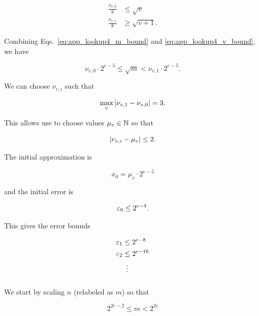 \begin{align}
    \frac{\nu_{v,0}}{8} &\le \sqrt{v} \nonumber\\
    \frac{\nu_{v,1}}{8} &\ge \sqrt{v+1}.
    \label{eq:app_lookup4_v_bound}
\end{align}

\noindent
Combining Eqs.~\eqref{eq:app_lookup4_m_bound} and
\eqref{eq:app_lookup4_v_bound},
we have

\begin{equation}
    \nu_{v,0}\cdot2^{e-5} \le \sqrt{m} < \nu_{v,1}\cdot2^{e-5}.
\end{equation}

\noindent
We can choose $\nu_{v,i}$ such that

\begin{equation}
    \max_{v} \left| \nu_{v,1} - \nu_{v,0} \right| = 3.
\end{equation}

\noindent
This allows use to choose values $\mu_{v}\in\mathbb{N}$ so that

\begin{equation}
    \left| \nu_{v,i} - \mu_{v} \right| \le 2.
\end{equation}

The initial approximation is

\begin{equation}
    x_{0} = \mu_{v}\cdot2^{e-5}
\end{equation}

\noindent
and the initial error is

\begin{equation}
    \varepsilon_{0} \le 2^{e-4}.
\end{equation}

\noindent
This gives the error bounds

\begin{align}
    \varepsilon_{1} &\le 2^{e-8} \nonumber\\
    \varepsilon_{2} &\le 2^{e-16} \nonumber\\
        &\ \vdots
\end{align}


\subsubsection{\LookupEight{}}
\label{app:error_bounds:lookup8}

We start by scaling $n$ (relabeled as $m$) so that

\begin{equation}
    2^{2e-2} \le m < 2^{2e}
\end{equation}

